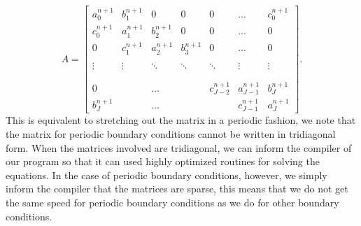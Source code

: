 \begin{equation}
A =
\begin{bmatrix}
	a_0^{n+1} & b_1^{n+1} & 0                & 0                & 0        & \dots                                 & c_0^{n+1}        \\
	c_0^{n+1} & a_1^{n+1} & b_2^{n+1} & 0                & 0        & \dots                                 & 0        \\
	0                & c_1^{n+1} & a_2^{n+1} & b_3^{n+1}   & 0        & \dots                                 & 0        \\
			     &                   &                   &                  &           &                                         &           \\
	\vdots         & \vdots         & \ddots         & \ddots         & \ddots & \vdots                              & \vdots \\
			     &                   &                   &                  &           &                                         &           \\
			     &                   &                   &                  &           &                                         &           \\
	0                &                   & \dots           &                   &  c_{J-2}^{n+1} & a_{J-1}^{n+1}  & b_J^{n+1} \\
	b_J^{n+1}                &                   & \dots           &                   &                         &  c_{J-1}^{n+1} & a_J^{n+1}
\end{bmatrix}.
\end{equation}
This is equivalent to stretching out the matrix in a periodic fashion, we note that the matrix for periodic boundary conditions cannot be written in tridiagonal form. When the matrices involved are tridiagonal, we can inform the compiler of our program so that it can used highly optimized routines for solving the equations. In the case of periodic boundary conditions, however, we simply inform the compiler that the matrices are sparse, this means that we do not get the same speed for periodic boundary conditions as we do for other boundary conditions.

